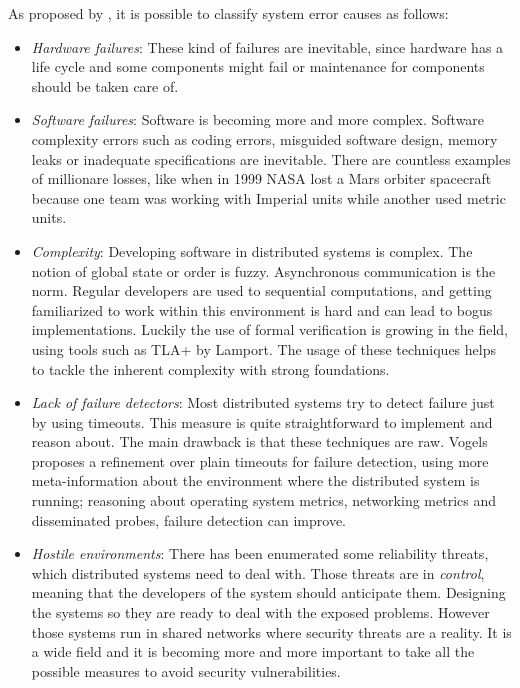 As proposed by \cite{GuideReliable}, it is possible to classify system error
causes as follows:
\begin{itemize}
\item \textit{Hardware failures}: These kind of failures are inevitable, since
  hardware has a life cycle and some components might fail or maintenance for
  components should be taken care of.
\item \textit{Software failures}: Software is becoming more and more complex.
  Software complexity errors such as coding errors, misguided software design,
  memory leaks or inadequate specifications are inevitable. There are countless
  examples of millionare losses, like when in 1999 NASA lost a Mars orbiter
  spacecraft because one team was working with Imperial units while another used
  metric units.
\item \textit{Complexity}: Developing software in distributed systems is
  complex. The notion of global state or order is fuzzy. Asynchronous
  communication is the norm. Regular developers are used to sequential
  computations, and getting familiarized to work within this environment is hard
  and can lead to bogus implementations. Luckily the use of formal verification
  is growing in the field, using tools such as TLA+\cite{tla} by Lamport. The
  usage of these techniques helps to tackle the inherent complexity with strong
  foundations.
\item \textit{Lack of failure detectors}: Most distributed systems try to detect
  failure just by using timeouts. This measure is quite straightforward to
  implement and reason about. The main drawback is that these techniques are
  raw. Vogels \cite{vogels} proposes a refinement over plain timeouts for
  failure detection, using more meta-information about the environment where
  the distributed system is running; reasoning about operating system metrics,
  networking metrics and disseminated probes, failure detection can improve.
\item \textit{Hostile environments}: There has been enumerated some reliability
  threats, which distributed systems need to deal with. Those threats are in
  \textit{control}, meaning that the developers of the system should anticipate
  them. Designing the systems so they are ready to deal with the exposed
  problems. However those systems run in shared networks where security threats
  are a reality. It is a wide field and it is becoming more and more important
  to take all the possible measures to avoid security vulnerabilities.
\end{itemize}

